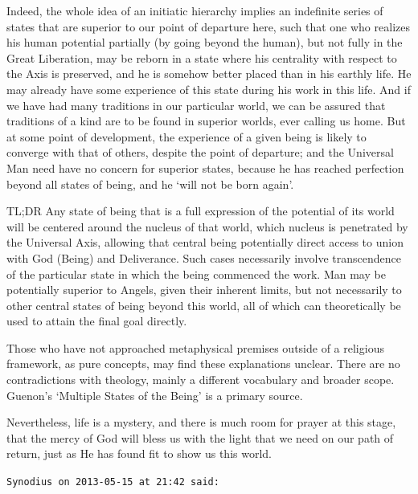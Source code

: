 \begin{footnotesize}
\begin{sffamily}
Indeed, the whole idea of an initiatic hierarchy implies an indefinite series of states that are superior to our point of departure here, such that one who realizes his human potential partially (by going beyond the human), but not fully in the Great Liberation, may be reborn in a state where his centrality with respect to the Axis is preserved, and he is somehow better placed than in his earthly life. He may already have some experience of this state during his work in this life. And if we have had many traditions in our particular world, we can be assured that traditions of a kind are to be found in superior worlds, ever calling us home. But at some point of development, the experience of a given being is likely to converge with that of others, despite the point of departure; and the Universal Man need have no concern for superior states, because he has reached perfection beyond all states of being, and he `will not be born again'.

TL;DR Any state of being that is a full expression of the potential of its world will be centered around the nucleus of that world, which nucleus is penetrated by the Universal Axis, allowing that central being potentially direct access to union with God (Being) and Deliverance. Such cases necessarily involve transcendence of the particular state in which the being commenced the work. Man may be potentially superior to Angels, given their inherent limits, but not necessarily to other central states of being beyond this world, all of which can theoretically be used to attain the final goal directly.

Those who have not approached metaphysical premises outside of a religious framework, as pure concepts, may find these explanations unclear. There are no contradictions with theology, mainly a different vocabulary and broader scope. Guenon's `Multiple States of the Being' is a primary source.

Nevertheless, life is a mystery, and there is much room for prayer at this stage, that the mercy of God will bless us with the light that we need on our path of return, just as He has found fit to show us this world.

\hfill

\texttt{Synodius on 2013-05-15 at 21:42 said:}


\end{sffamily}
\end{footnotesize}
